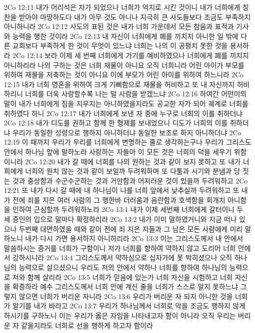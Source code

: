 2Co 12:11  내가 어리석은 자가 되었으나 너희가 억지로 시킨 것이니 내가 너희에게 칭찬을 받아야 마땅하도다 내가 아무 것도 아니나 지극히 큰 사도들보다 조금도 부족하지 아니하니라
2Co 12:12  사도의 표된 것은 내가 너희 가운데서 모든 참음과 표적과 기사와 능력을 행한 것이라
2Co 12:13  내 자신이 너희에게 폐를 끼치지 아니한 일 밖에 다른 교회보다 부족하게 한 것이 무엇이 있느냐 너희는 나의 이 공평치 못한 것을 용서하라
2Co 12:14  보라 이제 세 번째 너희에게 가기를 예비하였으나 너희에게 폐를 끼치지 아니하리라 나의 구하는 것은 너희 재물이 아니요 오직 너희니라 어린 아이가 부모를 위하여 재물을 저축하는 것이 아니요 이에 부모가 어린 아이를 위하여 하느니라
2Co 12:15  내가 너희 영혼을 위하여 크게 기뻐함으로 재물을 허비하고 또 내 자신까지 허비하리니 너희를 더욱 사랑할수록 나는 덜 사랑을 받겠느냐
2Co 12:16  하여간 어떤이의 말이 내가 너희에게 짐을 지우지는 아니하였을지라도 공교한 자가 되어 궤계로 너희를 취하였다 하니
2Co 12:17  내가 너희에게 보낸 자 중에 누구로 너희의 이를 취하더냐
2Co 12:18  내가 디도를 권하고 함께 한 형제를 보내었으니 디도가 너희의 이를 취하더냐 우리가 동일한 성령으로 행하지 아니하더냐 동일한 보조로 하지 아니하더냐
2Co 12:19  이 때까지 우리가 우리를 너희에게 변명하는 줄로 생각하는구나 우리가 그리스도 안에서 하나님 앞에 말하노라 사랑하는 자들아 이 모든 것은 너희의 덕을 세우기 위함이니라
2Co 12:20  내가 갈 때에 너희를 나의 원하는 것과 같이 보지 못하고 또 내가 너희에게 너희의 원치 않는 것과 같이 보일까 두려워하며 또 다툼과 시기와 분냄과 당 짓는 것과 중상함과 수군수군하는 것과 거만함과 어지러운 것이 있을까 두려워하고
2Co 12:21  또 내가 다시 갈 때에 내 하나님이 나를 너희 앞에서 낮추실까 두려워하고 또 내가 전에 죄를 지은 여러 사람의 그 행한바 더러움과 음란함과 호색함을 회개치 아니함을 인하여 근심할까 두려워하노라
2Co 13:1  내가 이제 세번째 너희에게 갈터이니 두 세 증인의 입으로 말마다 확정하리라
2Co 13:2  내가 이미 말하였거니와 지금 떠나 있으나 두번째 대면하였을 때와 같이 전에 죄 지은 자들과 그 남은 모든 사람에게 미리 말하노니 내가 다시 가면 용서하지 아니하리라
2Co 13:3  이는 그리스도께서 내 안에서 말씀하시는 증거를 너희가 구함이니 저가 너희를 향하여 약하지 않고 도리어 너희 안에서 강하시니라
2Co 13:4  그리스도께서 약하심으로 십자가에 못 박히셨으나 오직 하나님의 능력으로 살으셨으니 우리도 저의 안에서 약하나 너희를 향하여 하나님의 능력으로 저와 함께 살리라
2Co 13:5  너희가 믿음에 있는가 너희 자신을 시험하고 너희 자신을 확증하라 예수 그리스도께서 너희 안에 계신 줄을 너희가 스스로 알지 못하느냐 그렇지 않으면 너희가 버리운 자니라
2Co 13:6  우리가 버리운 자 되지 아니한 것을 너희가 알기를 내가 바라고
2Co 13:7  우리가 하나님께서 너희로 악을 조금도 행하지 않게 하시기를 구하노니 이는 우리가 옳은 자임을 나타내고자 함이 아니라 오직 우리는 버리운 자 같을지라도 너희로 선을 행하게 하고자 함이라
